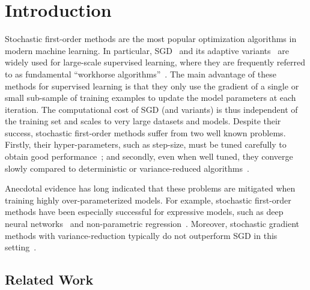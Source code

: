 
\chapter{Introduction}\label{ch:Introduction}


Stochastic first-order methods are the most popular optimization algorithms in modern machine learning.
In particular, \ac{SGD}~\citep{robbins1951sgd} and its adaptive variants~\citep{duchi2011adagrad, tieleman2012rmsprop, zeiler2012adadelta, kingma2015adam} are widely used for large-scale supervised learning, where they are frequently referred to as fundamental ``workhorse algorithms''~\citep{qian2019improvedrates, assran2019sgpush, grosse2015scaling}. 
The main advantage of these methods for supervised learning is that they only use the gradient of a single or small sub-sample of training examples to update the model parameters at each iteration.
The computational cost of \ac{SGD} (and variants) is thus independent of the training set and scales to very large datasets and models.
Despite their success, stochastic first-order methods suffer from two well known problems. 
Firstly, their hyper-parameters, such as step-size, must be tuned carefully to obtain good performance~\citep{bengio2012practical, schaul2013no, li2019convergence}; and
secondly, even when well tuned, they converge slowly compared to deterministic or variance-reduced algorithms~\citep{leroux2012sag, schmidt2017sag, johnson2013svrg, defazio2014saga}.
  
Anecdotal evidence has long indicated that these problems are mitigated when training highly over-parameterized models.
For example, stochastic first-order methods have been especially successful for expressive models, such as deep neural networks~\citep{zhang2013gradient, bengio2012practical} and non-parametric regression~\citep{liang2018just, belkin2019datainterp}.
Moreover, stochastic gradient methods with variance-reduction typically do not outperform \ac{SGD} in this setting~\citep{defazio2019effectiveness}.





\section{Related Work}

